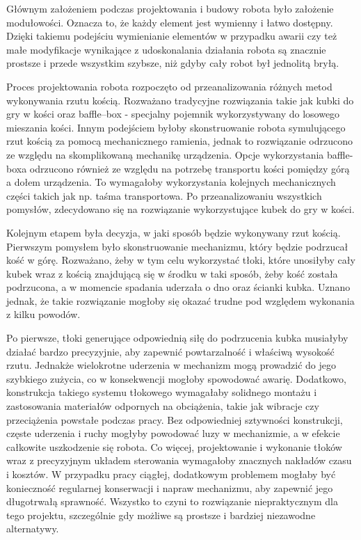 Głównym założeniem podczas projektowania i budowy robota było założenie modułowości. Oznacza to, że każdy element jest wymienny i łatwo dostępny.
Dzięki takiemu podejściu wymienianie elementów w przypadku awarii czy też małe modyfikacje wynikające z udoskonalania działania robota
są znacznie prostsze i przede wszystkim szybsze, niż gdyby cały robot był jednolitą bryłą.

Proces projektowania robota rozpoczęto od przeanalizowania różnych metod wykonywania rzutu kością. Rozważano tradycyjne rozwiązania takie jak kubki do gry w kości oraz baffle--box - specjalny pojemnik wykorzystywany do losowego mieszania kości.
Innym podejściem byłoby skonstruowanie robota symulującego rzut kością za pomocą mechanicznego ramienia, jednak to rozwiązanie odrzucono ze względu na 
skomplikowaną mechanikę urządzenia. Opcje wykorzystania baffle-boxa odrzucono również ze względu na potrzebę transportu kości pomiędzy górą a dołem urządzenia. To wymagałoby
wykorzystania kolejnych mechanicznych części takich jak np. taśma transportowa. Po przeanalizowaniu wszystkich pomysłów, zdecydowano się na rozwiązanie wykorzystujące kubek do gry w kości. 

Kolejnym etapem była decyzja, w jaki sposób będzie wykonywany rzut kością. Pierwszym pomysłem było skonstruowanie 
mechanizmu, który będzie podrzucał kość w górę. Rozważano, żeby w tym celu wykorzystać tłoki, które unosiłyby cały
kubek wraz z kością znajdującą się w środku w taki sposób, żeby kość została podrzucona, a w momencie spadania uderzała o dno oraz ścianki kubka.
Uznano jednak, że takie rozwiązanie mogłoby się okazać trudne pod względem wykonania z kilku powodów. 

Po pierwsze, tłoki generujące odpowiednią siłę do podrzucenia kubka musiałyby działać bardzo precyzyjnie, aby zapewnić powtarzalność i właściwą wysokość rzutu. Jednakże 
wielokrotne uderzenia w mechanizm mogą prowadzić do jego szybkiego zużycia, co w konsekwencji mogłoby spowodować awarię.
Dodatkowo, konstrukcja takiego systemu tłokowego wymagałaby solidnego montażu i zastosowania materiałów odpornych na obciążenia, takie jak 
wibracje czy przeciążenia powstałe podczas pracy. Bez odpowiedniej sztywności konstrukcji, częste uderzenia i ruchy mogłyby powodować luzy w mechanizmie, 
a w efekcie całkowite uszkodzenie się robota.
Co więcej, projektowanie i wykonanie tłoków wraz z precyzyjnym układem sterowania wymagałoby znacznych nakładów czasu i kosztów. W przypadku pracy 
ciągłej, dodatkowym problemem mogłaby być konieczność regularnej konserwacji i napraw mechanizmu, aby zapewnić jego długotrwałą sprawność. Wszystko to 
czyni to rozwiązanie niepraktycznym dla tego projektu, szczególnie gdy możliwe są prostsze i bardziej niezawodne alternatywy. 

